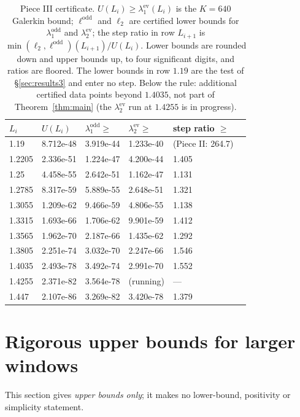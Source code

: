 \documentclass[11pt]{amsart}
\newcommand{\Lmax}{1.4035}                                %
\newcommand{\ev}{\mathrm{ev}}
\newcommand{\od}{\mathrm{odd}}
\theoremstyle{definition}
\theoremstyle{remark}
\numberwithin{equation}{section}
\begin{document}
\begin{table}[ht]
\centering\footnotesize
\caption{Piece III certificate. $U(L_i)\ge\lambda_1^\ev(L_i)$ is the $K=640$ Galerkin bound; $\ell^\od$ and $\ell_2$ are certified lower bounds for $\lambda_1^\od$ and $\lambda_2^\ev$; the step ratio in row $L_{i+1}$ is $\min(\ell_2,\ell^\od)(L_{i+1})/U(L_i)$. Lower bounds are rounded down and upper bounds up, to four significant digits, and ratios are floored. The lower bounds in row $1.19$ are the test of \S\ref{sec:results3} and enter no step. Below the rule: additional certified data points beyond $\Lmax$, not part of Theorem~\ref{thm:main} (the $\lambda_2^\ev$ run at $1.4255$ is in progress).}\label{tab:piece3}
\begin{tabular}{llllll}
\toprule
$L_i$ & $U(L_i)$ & $\lambda_1^\od\ge$ & $\lambda_2^\ev\ge$ & step ratio $\ge$\\
\midrule
1.19 & 8.712e-48 & 3.919e-44 & 1.233e-40 & (Piece II: 264.7)\\
1.2205 & 2.336e-51 & 1.224e-47 & 4.200e-44 & 1.405\\
1.25 & 4.458e-55 & 2.642e-51 & 1.162e-47 & 1.131\\
1.2785 & 8.317e-59 & 5.889e-55 & 2.648e-51 & 1.321\\
1.3055 & 1.209e-62 & 9.466e-59 & 4.806e-55 & 1.138\\
1.3315 & 1.693e-66 & 1.706e-62 & 9.901e-59 & 1.412\\
1.3565 & 1.962e-70 & 2.187e-66 & 1.435e-62 & 1.292\\
1.3805 & 2.251e-74 & 3.032e-70 & 2.247e-66 & 1.546\\
1.4035 & 2.493e-78 & 3.492e-74 & 2.991e-70 & 1.552\\
\midrule
1.4255 & 2.371e-82 & 3.564e-78 & (running) & ---\\
1.447 & 2.107e-86 & 3.269e-82 & 3.420e-78 & 1.379\\
\bottomrule
\end{tabular}
\end{table}

\section{Rigorous upper bounds for larger windows}\label{sec:upper}

This section gives \emph{upper bounds only}; it makes no lower-bound, positivity or simplicity statement.
\end{document}
